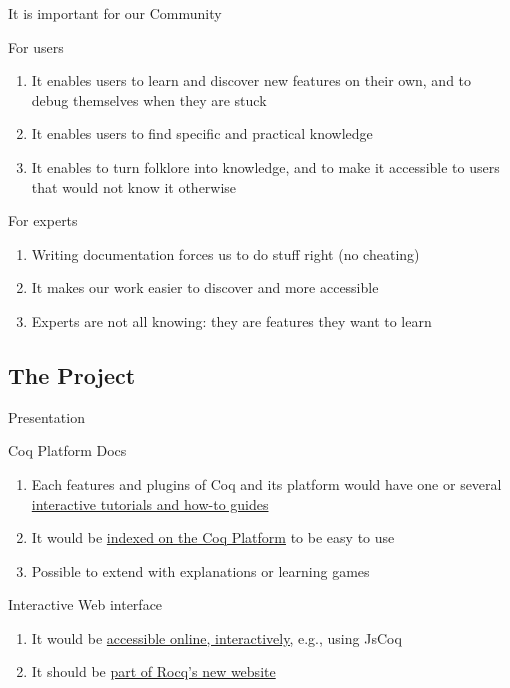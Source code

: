\documentclass[10pt]{beamer}
\begin{document}
\begin{frame}{It is important for our Community}
\begin{tcbProp}{For users}
  \begin{enumerate}
    \item It enables users to learn and discover new features on their own,
          and to debug themselves when they are stuck
    \item<2-> It enables users to find specific and practical knowledge
    \item<3-> It enables to turn folklore into knowledge, and to make it
          accessible to users that would not know it otherwise
  \end{enumerate}
\end{tcbProp}
\begin{tcbProp}{For experts}
  \begin{enumerate}
    \item<4-> Writing documentation forces us to do stuff right (no cheating)
    \item<5-> It makes our work easier to discover and more accessible
    \item<6-> Experts are not all knowing: they are features they want to learn
  \end{enumerate}
\end{tcbProp}
\end{frame}

\subsection{The Project}

\begin{frame}{Presentation}
  \begin{tcbObj}{Coq Platform Docs}
    \begin{enumerate}
      \item<1-> Each features and plugins of Coq and its platform would have one
            or several \ul{interactive tutorials and how-to guides}
      \item<2-> It would be \ul{indexed on the Coq Platform} to be easy to use
      \item<3-> Possible to extend with explanations or learning games
    \end{enumerate}
  \end{tcbObj}
  \begin{tcbObj}{Interactive Web interface}
    \begin{enumerate}
      \item<5-> It would be \ul{accessible online, interactively,} e.g., using JsCoq
      \item<6-> It should be \ul{part of Rocq's new website}
    \end{enumerate}
  \end{tcbObj}
\end{frame}
\end{document}
